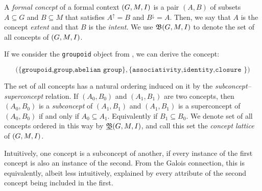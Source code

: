 \begin{definition}
  \label{definition:formal-concept}  A \textit{formal concept} of a formal context $(G,M,\mathrel{I})$ is a pair $(A,B)$ of subsets
  $A \subseteq G$ and $B \subseteq M$ that satisfies $A^{\uparrow}= B$ and $B^{\downarrow}= A$. Then, we say that $A$ is the concept \textit{extent}
  and that $B$ is the \textit{intent}. We use ${\mathfrak B} (G,M,\mathrel{I})$ to denote the set of all concepts of $(G,M,\mathrel{I})$.
\end{definition}

\begin{example}
  \label{example:formal-concept} If we consider the \texttt{groupoid} object from , we can derive
  the concept:

  \[
    \big(\{\texttt{groupoid,group,abelian group}\}, \{\texttt{associativity,identity,closure }\} \big)
  \]


\end{example}

The set of all concepts has a natural ordering induced on it by the \textit{subconcept--superconcept} relation. If $(A_{0},B_{0})$ and $(A_{1}
,B_{1})$ are two concepts, then $(A_{0},B_{0})$ is a \textit{subconcept} of $(A_{1}, B_{1})$ and $(A_{1}, B_{1})$ is a superconcept of $(A_{0}
,B_{0})$ if and only if $A_{0}\subseteq A_{1}$. Equivalently if $B_{1}\subseteq B_{0}$. We denote set of all concepts ordered in this way by
$\underline{{\mathfrak B}} (G,M,\mathrel{I})$, and call this set the \textit{concept lattice} of $(G,M,\mathrel{I})$.

Intuitively, one concept is a subconcept of another, if every instance of the first concept is also an instance of the second. From the
Galois connection, this is equivalently, albeit less intuitively, explained by every attribute of the second concept being included in the first.

